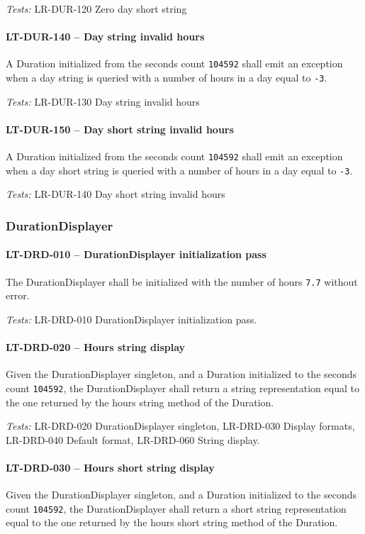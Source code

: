 \textit{Tests: } LR-DUR-120 Zero day short string

\paragraph{LT-DUR-140 -- Day string invalid hours}
A Duration initialized from the seconds count \lstinline{104592}
shall emit an exception when a day string is queried with a
number of hours in a day equal to \lstinline{-3}.

\textit{Tests: } LR-DUR-130 Day string invalid hours

\paragraph{LT-DUR-150 -- Day short string invalid hours}
A Duration initialized from the seconds count \lstinline{104592}
shall emit an exception when a day short string is queried with a
number of hours in a day equal to \lstinline{-3}.

\textit{Tests: } LR-DUR-140 Day short string invalid hours

\subsubsection{DurationDisplayer}
\paragraph{LT-DRD-010 -- DurationDisplayer initialization pass}
The DurationDisplayer shall be initialized with the number of hours
\lstinline{7.7} without error.

\textit{Tests: } LR-DRD-010 DurationDisplayer initialization pass.

\paragraph{LT-DRD-020 -- Hours string display}
Given the DurationDisplayer singleton, and a Duration initialized
to the seconds count \lstinline{104592}, the DurationDisplayer
shall return a string representation equal to the one returned
by the hours string method of the Duration.

\textit{Tests: } LR-DRD-020 DurationDisplayer singleton,
LR-DRD-030 Display formats, LR-DRD-040 Default format, LR-DRD-060 String
display.

\paragraph{LT-DRD-030 -- Hours short string display}
Given the DurationDisplayer singleton, and a Duration initialized
to the seconds count \lstinline{104592}, the DurationDisplayer
shall return a short string representation equal to the one
returned by the hours short string method of the Duration.

